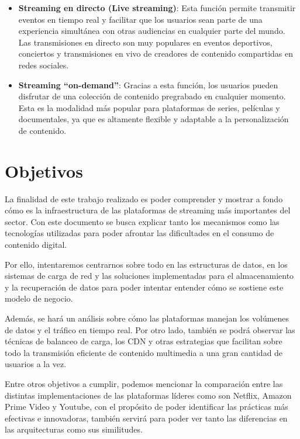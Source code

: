 \documentclass[12pt,a4paper]{article}
\begin{document}
\begin{itemize}
    \item \textbf{Streaming en directo (Live streaming)}: Esta función permite transmitir eventos en tiempo real y facilitar que los usuarios sean parte de una experiencia simultánea con otras audiencias en cualquier parte del mundo. Las transmisiones en directo son muy populares en eventos deportivos, conciertos y transmisiones en vivo de creadores de contenido compartidas en redes sociales.
    \item \textbf{Streaming “on-demand”}: Gracias a esta función, los usuarios pueden disfrutar de una colección de contenido pregrabado en cualquier momento. Esta es la modalidad más popular para plataformas de series, películas y documentales, ya que es altamente flexible y adaptable a la personalización de contenido.
\end{itemize}
\newpage

\section{Objetivos}

La finalidad de este trabajo realizado es poder comprender y mostrar a fondo cómo es la infraestructura de las plataformas de streaming más importantes del sector. Con este documento se busca explicar tanto los mecanismos como las tecnologías utilizadas para poder afrontar las dificultades en el consumo de contenido digital.

Por ello, intentaremos centrarnos sobre todo en las estructuras de datos, en los sistemas de carga de red y las soluciones implementadas para el almacenamiento y la recuperación de datos para poder intentar entender cómo se sostiene este modelo de negocio.

Además, se hará un análisis sobre cómo las plataformas manejan los volúmenes de datos y el tráfico en tiempo real. Por otro lado, también se podrá observar las técnicas de balanceo de carga, los CDN y otras estrategias que facilitan sobre todo la transmisión eficiente de contenido multimedia a una gran cantidad de usuarios a la vez.

Entre otros objetivos a cumplir, podemos mencionar la comparación entre las distintas implementaciones de las plataformas líderes como son Netflix, Amazon Prime Video y Youtube, con el propósito de poder identificar las prácticas más efectivas e innovadoras, también servirá para poder ver tanto las diferencias en las arquitecturas como sus similitudes.
\end{document}
